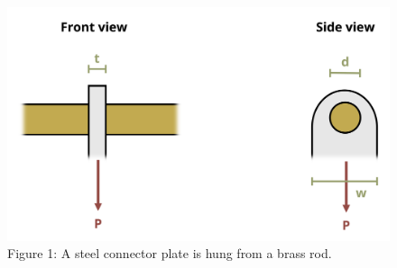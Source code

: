 \documentclass[
  letterpaper,
  DIV=11,
  numbers=noendperiod]{scrreprt}
\begin{document}
\begin{figure}[H]

{\centering \includegraphics{images/169.png}

}

\caption{Figure 1: A steel connector plate is hung from a brass rod.}

\end{figure}%
\end{document}
